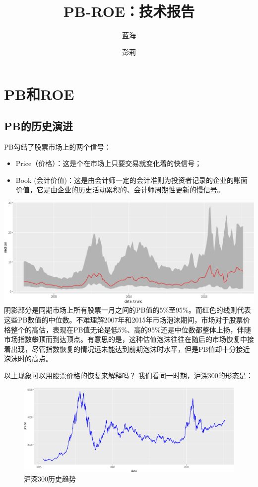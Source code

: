 \documentclass[hyperref,]{ctexart}
\title{PB-ROE：技术报告}
\author{蓝海 \and 彭莉}
\date{}
\providecommand{\tightlist}{%
  \setlength{\itemsep}{0pt}\setlength{\parskip}{0pt}}
\begin{document}
\maketitle

{
\setcounter{tocdepth}{2}
\tableofcontents
}
\section{PB和ROE}\label{pbroe}

\subsection{PB的历史演进}\label{pb}

PB勾结了股票市场上的两个信号：

\begin{itemize}
\tightlist
\item
  Price（价格）：这是个在市场上只要交易就变化着的快信号；
\item
  Book
  (会计价值)：这是由会计师一定的会计准则为投资者记录的企业的账面价值，它是由企业的历史活动累积的、会计师周期性更新的慢信号。
\end{itemize}

\includegraphics{PB-ROE_files/figure-latex/unnamed-chunk-2-1.pdf}
阴影部分是同期市场上所有股票一月之间的PB值的5\%至95\%。而红色的线则代表这些PB数值的中位数。不难理解2007年和2015年市场泡沫期间，市场对于股票价格整个的高估，表现在PB值无论是低5\%、高的95\%还是中位数都整体上扬，伴随市场指数攀顶而到达顶点。有意思的是，这种估值泡沫往往在随后的市场恢复中接着出现，尽管指数恢复的情况远未能达到前期泡沫时水平，但是PB值却十分接近泡沫时的高点。

以上现象可以用股票价格的恢复来解释吗？ 我们看同一时期，沪深300的形态是：

\begin{figure}[htbp]
\centering
\includegraphics{PB-ROE_files/figure-latex/unnamed-chunk-3-1.pdf}
\caption{沪深300历史趋势}
\end{figure}
\end{document}
